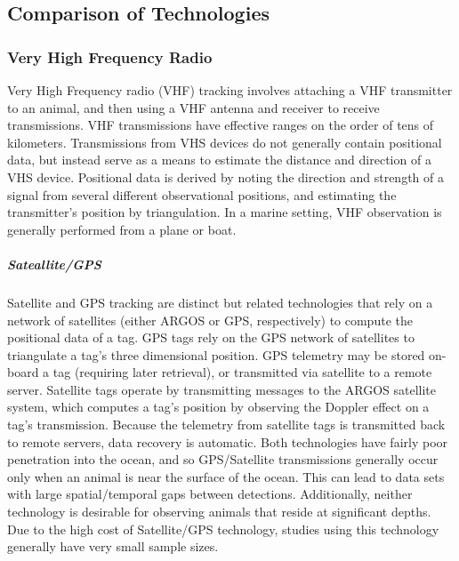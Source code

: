 \subsection{Comparison of Technologies}
\subsubsection{Very High Frequency Radio}
Very High Frequency radio (VHF) tracking involves attaching a VHF transmitter to an animal, and then using a VHF antenna and receiver to receive transmissions.  VHF transmissions have effective ranges on the order of tens of kilometers.  Transmissions from VHS devices do not generally contain positional data, but instead serve as a means to estimate the distance and direction of a VHS device.  Positional data is derived by noting the direction and strength of a signal from several different observational positions, and estimating the transmitter's position by triangulation\cite{USDA}.  In a marine setting, VHF observation is generally performed from a plane or boat\cite{Wikipedia_RadioTracking}.

\subparagraph{Sateallite/GPS}
Satellite and GPS tracking are distinct but related technologies that rely on a network of satellites (either ARGOS or GPS, respectively) to compute the positional data of a tag. GPS tags rely on the GPS network of satellites to triangulate a tag's three dimensional position. GPS telemetry may be stored on-board a tag (requiring later retrieval), or transmitted via satellite to a remote server\cite{USDA}. Satellite tags operate by transmitting messages to the ARGOS satellite system, which computes a tag's position by observing the Doppler effect on a tag's transmission\cite{ARGOS}.  Because the telemetry from satellite tags is transmitted back to remote servers, data recovery is automatic.  Both technologies have fairly poor penetration into the ocean, and so GPS/Satellite transmissions generally occur only when an animal is near the surface of the ocean.  This can lead to data sets with large spatial/temporal gaps between detections.  Additionally, neither technology is desirable for observing animals that reside at significant depths.  Due to the high cost of Satellite/GPS technology, studies using this technology generally have very small sample sizes.  

